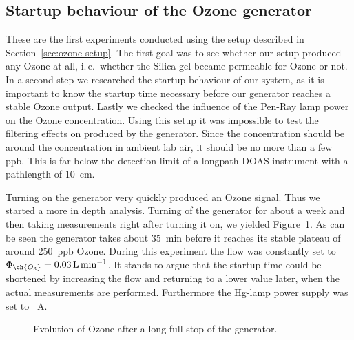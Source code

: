 \subsection{Startup behaviour of the Ozone generator}
\label{sec:ozone}

These are the first experiments conducted using the setup described in
Section~\ref{sec:ozone-setup}. The first goal was to see whether our
setup produced any Ozone at all, i.\,e.\ whether the Silica gel became
permeable for Ozone or not. In a second step we researched the startup
behaviour of our system, as it is important to know the startup time
necessary before our generator reaches a stable Ozone output. Lastly
we checked the influence of the Pen-Ray lamp power on the Ozone
concentration. Using this setup it was impossible to test the
filtering effects on  produced by the generator. Since the
concentration should be around the  concentration in ambient
lab air, it should be no more than a few \si{ppb}. This is far below
the detection limit of a longpath DOAS instrument with a pathlength of
\SI{10}{\centi\meter}. 

Turning on the generator very quickly produced an Ozone signal. Thus
we started a more in depth analysis. Turning of the generator for
about a week and then taking measurements right after turning it on,
we yielded Figure~\ref{fig:long-stop}. As can be seen the generator
takes about \SI{35}{\minute} before it reaches its stable plateau of
around \SI{250}{ppb} Ozone. During this experiment the flow was
constantly set to $\Phi_{\ch{O_3}} = \SI{0.03}{\liter\per\minute}$. It
stands to argue that the startup time could be shortened by increasing
the flow and returning to a lower value later, when the actual 
measurements are performed. Furthermore the Hg-lamp power supply was
set to \SI{}{A}.

\begin{figure}[htbp]
  \centering
  \caption{Evolution of Ozone after a long full stop of the
    generator.}
  \label{fig:long-stop}
\end{figure}

